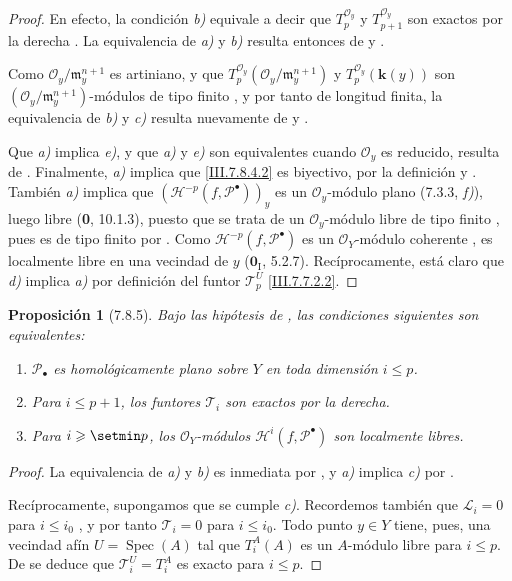 \documentclass[10pt,oneside,openany]{book}
\theoremstyle{egaenv}\newtheorem*{env}{---}
\theoremstyle{egastatement}
\newtheorem*{proposition}{Proposición}
\theoremstyle{egadescription}
\newcommand{\oldpage}[2][]{\marginnote{\normalfont\scriptsize\textbf{#1}\,|\,#2}\ignorespaces}
\renewcommand{\leq}{\leqslant}
\renewcommand{\geq}{\geqslant}
\begin{document}
\oldpage[III]{206}
\begin{proof}
En efecto, la condición \emph{b)} equivale a decir que $T_p^{\mathscr O_y}$ y $T_{p+1}^{\mathscr O_y}$
son exactos por la derecha . La equivalencia de \emph{a)}
y \emph{b)} resulta entonces de  y .

Como $\mathscr O_y/\mathfrak m_y^{n+1}$ es artiniano, y que
$T_p^{\mathscr O_y}(\mathscr O_y/\mathfrak m_y^{n+1})$ y
$T_p^{\mathscr O_y}(\boldsymbol{k}(y))$ son
$(\mathscr O_y/\mathfrak m_y^{n+1})$-módulos de tipo finito
, y por tanto de longitud finita, la equivalencia de
\emph{b)} y \emph{c)} resulta nuevamente de  y
.

Que \emph{a)} implica \emph{e)}, y que \emph{a)} y \emph{e)} son equivalentes cuando
$\mathscr O_y$ es reducido, resulta de .
Finalmente, \emph{a)} implica que \eqref{III.7.8.4.2} es biyectivo, por la
definición  y . También \emph{a)} implica que
$(\mathcal H^{-p}(f,\mathscr P^\bullet))_y$
es un $\mathscr O_y$-módulo plano (7.3.3, \emph{f)}), luego libre (\textbf{0}, 10.1.3), puesto que se trata de un $\mathscr O_y$-módulo libre de
tipo finito , pues es de tipo finito por
. Como $\mathcal H^{-p}(f,\mathscr P^\bullet)$ es
un $\mathscr O_Y$-módulo coherente , es localmente
libre en una vecindad de $y$
($\mathbf{0}_{\mathrm I}$, 5.2.7). Recíprocamente, está claro que \emph{d)} implica \emph{a)} por
definición del funtor $\mathscr T_p^U$ \eqref{III.7.7.2.2}.
\end{proof}

\begin{proposition}[7.8.5]
\label{III.7.8.5}
Bajo las hipótesis de \textup{}, las condiciones siguientes
son equivalentes:
\begin{enumerate}
  \item[\textup{a)}] $\mathscr P_\bullet$ es homológicamente plano sobre $Y$
    en toda dimensión $i\leq p$.
  \item[\textup{b)}] Para $i\leq p+1$, los funtores $\mathscr T_i$ son
    exactos por la derecha.
  \item[\textup{c)}] Para $i\geq\setmin p$, los $\mathscr O_Y$-módulos
    $\mathcal H^i(f,\mathscr P^\bullet)$ son localmente libres.
\end{enumerate}
\end{proposition}

\begin{proof}
La equivalencia de \emph{a)} y \emph{b)} es inmediata por , y \emph{a)}
implica \emph{c)} por .

Recíprocamente, supongamos que se cumple \emph{c)}. Recordemos también que
$\mathscr L_i=0$ para $i\leq i_0$ , y por tanto
$\mathscr T_i=0$ para $i\leq i_0$. Todo punto $y\in Y$ tiene, pues,
una vecindad afín $U=\operatorname{Spec}(A)$ tal que $T_i^A(A)$ es un $A$-módulo
libre para $i\leq p$. De  se deduce que
$\mathscr T_i^U=T_i^A$ es exacto para $i\leq p$.
\end{proof}
\end{document}
